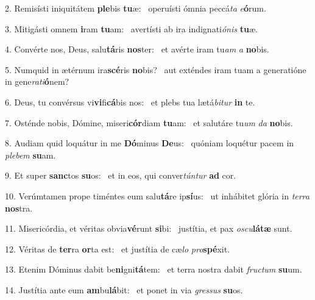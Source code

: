 2. Remisísti iniquitátem \textbf{ple}bis \textbf{tu}æ: \ast\  operuísti ómnia peccá\textit{ta} \textit{e}\textbf{ó}rum.\

3. Mitigásti omnem \textbf{i}ram \textbf{tu}am: \ast\  avertísti ab ira indignati\textit{ó}\textit{nis} \textbf{tu}æ.\

4. Convérte nos, Deus, salu\textbf{tá}ris \textbf{nos}ter: \ast\  et avérte iram tu\textit{am} \textit{a} \textbf{no}bis.\

5. Numquid in ætérnum ira\textbf{scé}ris \textbf{no}bis? \ast\  aut exténdes iram tuam a generatióne in gene\textit{ra}\textit{ti}\textbf{ó}nem?\

6. Deus, tu convérsus vi\textbf{vi}fi\textbf{cá}bis nos: \ast\  et plebs tua lætá\textit{bi}\textit{tur} \textbf{in} te.\

7. Osténde nobis, Dómine, miseri\textbf{cór}diam \textbf{tu}am: \ast\  et salutáre tu\textit{um} \textit{da} \textbf{no}bis.\

8. Audiam quid loquátur in me \textbf{Dó}minus \textbf{De}us: \ast\  quóniam loquétur pacem in \textit{ple}\textit{bem} \textbf{su}am.\

9. Et super \textbf{sanc}tos \textbf{su}os: \ast\  et in eos, qui conver\textit{tún}\textit{tur} \textbf{ad} cor.\

10. Verúmtamen prope timéntes eum salu\textbf{tá}re ip\textbf{sí}us: \ast\  ut inhábitet glória in \textit{ter}\textit{ra} \textbf{nos}tra.\

11. Misericórdia, et véritas obvia\textbf{vé}runt \textbf{si}bi: \ast\  justítia, et pax \textit{os}\textit{cu}\textbf{lá}\textbf{tæ} sunt.\

12. Véritas de \textbf{ter}ra \textbf{or}ta est: \ast\  et justítia de cæ\textit{lo} \textit{pro}\textbf{spé}xit.\

13. Etenim Dóminus dabit be\textbf{ni}gni\textbf{tá}tem: \ast\  et terra nostra dabit \textit{fruc}\textit{tum} \textbf{su}um.\

14. Justítia ante eum \textbf{am}bu\textbf{lá}bit: \ast\  et ponet in via \textit{gres}\textit{sus} \textbf{su}os.\

